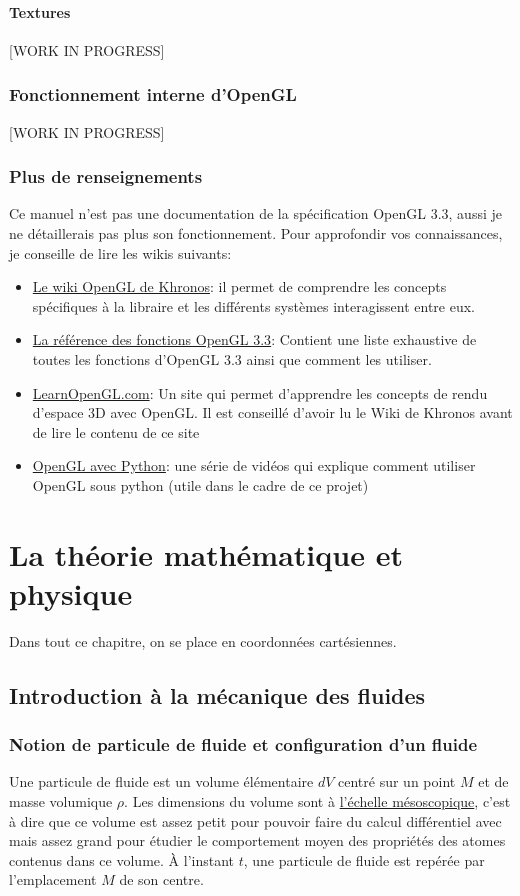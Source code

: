 \documentclass[a4paper,10pt]{report}
\begin{document}
\subsubsection{Textures}
[WORK IN PROGRESS]

\subsection{Fonctionnement interne d'OpenGL}
[WORK IN PROGRESS]

\subsection{Plus de renseignements}
Ce manuel n'est pas une documentation de la spécification OpenGL 3.3, aussi je ne détaillerais pas plus son fonctionnement. Pour approfondir vos connaissances, je conseille de lire les wikis suivants:
\begin{itemize}
 \item \href{https://www.khronos.org/opengl/wiki/}{Le wiki OpenGL de Khronos}: il permet de comprendre les concepts spécifiques à la libraire et les différents systèmes interagissent entre eux.
 \item \href{http://www.hyzgame.org.cn/OpenGL/man3/bottom.php}{La référence des fonctions OpenGL 3.3}: Contient une liste exhaustive de toutes les fonctions d'OpenGL 3.3 ainsi que comment les utiliser.
 \item \href{https://learnopengl.com}{LearnOpenGL.com}: Un site qui permet d'apprendre les concepts de rendu d'espace 3D avec OpenGL. Il est conseillé d'avoir lu le Wiki de Khronos avant de lire le contenu de ce site
 \item \href{https://www.youtube.com/playlist?list=PLn3eTxaOtL2PDnEVNwOgZFm5xYPr4dUoR}{OpenGL avec Python}: une série de vidéos qui explique comment utiliser OpenGL sous python (utile dans le cadre de ce projet)
\end{itemize}


\chapter{La théorie mathématique et physique}
Dans tout ce chapitre, on se place en coordonnées cartésiennes.
\section{Introduction à la mécanique des fluides}
\subsection{Notion de particule de fluide et configuration d'un fluide}
Une particule de fluide est un volume élémentaire $dV$ centré sur un point $M$ et de masse volumique $\rho$. Les dimensions du volume sont à \href{https://fr.wikipedia.org/wiki/Mésoscopique}{l'échelle mésoscopique}, c'est à dire que ce volume est assez petit pour pouvoir faire du calcul différentiel avec mais assez grand pour étudier le comportement moyen des propriétés des atomes contenus dans ce volume.
À l'instant $t$, une particule de fluide est repérée par l'emplacement $M$ de son centre.
\end{document}
